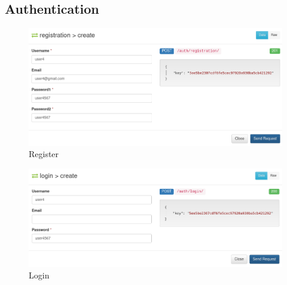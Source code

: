 \documentclass[11pt]{article}
\begin{document}
\subsection{Authentication}
\label{sec:org20c7d93}
\begin{figure}[htbp]
\centering
\includegraphics[width=.9\linewidth]{img/registration.png}
\caption{Register}
\end{figure}
\begin{figure}[htbp]
\centering
\includegraphics[width=.9\linewidth]{img/login.png}
\caption{Login}
\end{figure}

\newpage
\end{document}
